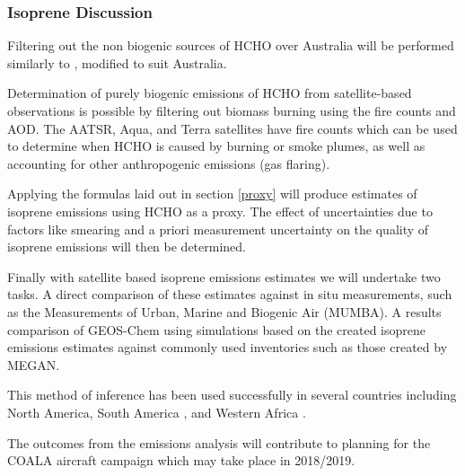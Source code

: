 \subsubsection{Isoprene Discussion}

Filtering out the non biogenic sources of HCHO over Australia will be performed similarly to \cite{Marais_2012}, modified to suit Australia.

Determination of purely biogenic emissions of HCHO from satellite-based observations is possible by filtering out biomass burning using the fire counts and AOD.
The AATSR, Aqua, and Terra satellites have fire counts which can be used to determine when HCHO is caused by burning or smoke plumes, as well as accounting for other anthropogenic emissions (gas flaring).

Applying the formulas laid out in section \ref{proxy} will produce estimates of isoprene emissions using HCHO as a proxy.
The effect of uncertainties due to factors like smearing and a priori measurement uncertainty on the quality of isoprene emissions will then be determined.

Finally with satellite based isoprene emissions estimates we will undertake two tasks.
A direct comparison of these estimates against in situ measurements, such as the Measurements of Urban, Marine and Biogenic Air (MUMBA).
A results comparison of GEOS-Chem using simulations based on the created isoprene emissions estimates against commonly used inventories such as those created by MEGAN.

This method of inference has been used successfully in several countries including North America\cite{Palmer_2003}, South America \cite{Barkley_2013}, and Western Africa \cite{Marais_2012}.


The outcomes from the emissions analysis will contribute to planning for the COALA aircraft campaign which may take place in 2018/2019.
